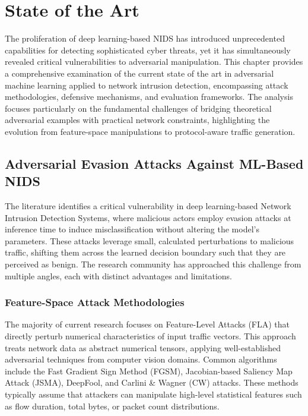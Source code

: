 \chapter{State of the Art}
\label{chapter:sota}

The proliferation of deep learning-based NIDS has introduced unprecedented capabilities for detecting sophisticated cyber threats, yet it has simultaneously revealed critical vulnerabilities to adversarial manipulation. This chapter provides a comprehensive examination of the current state of the art in adversarial machine learning applied to network intrusion detection, encompassing attack methodologies, defensive mechanisms, and evaluation frameworks. The analysis focuses particularly on the fundamental challenges of bridging theoretical adversarial examples with practical network constraints, highlighting the evolution from feature-space manipulations to protocol-aware traffic generation.

\section{Adversarial Evasion Attacks Against ML-Based NIDS}
\label{sec:adversarial_attacks}

The literature identifies a critical vulnerability in deep learning-based Network Intrusion Detection Systems, where malicious actors employ evasion attacks at inference time to induce misclassification without altering the model's parameters. These attacks leverage small, calculated perturbations to malicious traffic, shifting them across the learned decision boundary such that they are perceived as benign. The research community has approached this challenge from multiple angles, each with distinct advantages and limitations.

\subsection{Feature-Space Attack Methodologies}

The majority of current research focuses on Feature-Level Attacks (FLA) that directly perturb numerical characteristics of input traffic vectors. This approach treats network data as abstract numerical tensors, applying well-established adversarial techniques from computer vision domains. Common algorithms include the Fast Gradient Sign Method (FGSM), Jacobian-based Saliency Map Attack (JSMA), DeepFool, and Carlini \& Wagner (CW) attacks. These methods typically assume that attackers can manipulate high-level statistical features such as flow duration, total bytes, or packet count distributions.

